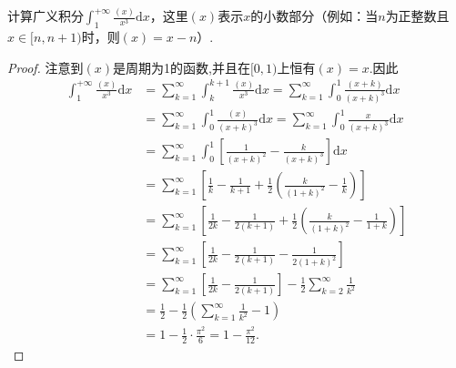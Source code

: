 \documentclass[../../main.tex]{subfiles}
\begin{document}
\begin{example}
计算广义积分$\int_{1}^{+\infty} \frac{(x)}{x^3} \mathrm{d}x$，这里$(x)$表示$x$的小数部分（例如：当$n$为正整数且$x \in [n, n+1)$时，则$(x) = x - n$）.
\end{example}
\begin{proof}
注意到$(x)$是周期为1的函数,并且在$[0,1)$上恒有$(x)=x$.因此
\begin{align*}
\int_1^{+\infty}{\frac{\left( x \right)}{x^3}\mathrm{d}x}&=\sum\limits_{k=1}^{\infty}{\int_k^{k+1}{\frac{\left( x \right)}{x^3}\mathrm{d}x}}=\sum\limits_{k=1}^{\infty}{\int_0^1{\frac{\left( x+k \right)}{\left( x+k \right) ^3}\mathrm{d}x}}
\\
&=\sum\limits_{k=1}^{\infty}{\int_0^1{\frac{\left( x \right)}{\left( x+k \right) ^3}\mathrm{d}x}}=\sum\limits_{k=1}^{\infty}{\int_0^1{\frac{x}{\left( x+k \right) ^3}\mathrm{d}x}}
\\
&=\sum\limits_{k=1}^{\infty}{\int_0^1{\left[ \frac{1}{\left( x+k \right) ^2}-\frac{k}{\left( x+k \right) ^3} \right] \mathrm{d}x}}
\\
&=\sum\limits_{k=1}^{\infty}{\left[ \frac{1}{k}-\frac{1}{k+1}+\frac{1}{2}\left( \frac{k}{\left( 1+k \right) ^2}-\frac{1}{k} \right) \right]}
\\
&=\sum\limits_{k=1}^{\infty}{\left[ \frac{1}{2k}-\frac{1}{2\left( k+1 \right)}+\frac{1}{2}\left( \frac{k}{\left( 1+k \right) ^2}-\frac{1}{1+k} \right) \right]}
\\
&=\sum\limits_{k=1}^{\infty}{\left[ \frac{1}{2k}-\frac{1}{2\left( k+1 \right)}-\frac{1}{2\left( 1+k \right) ^2} \right]}
\\
&=\sum\limits_{k=1}^{\infty}{\left[ \frac{1}{2k}-\frac{1}{2\left( k+1 \right)} \right]}-\frac{1}{2}\sum\limits_{k=2}^{\infty}{\frac{1}{k ^2}}
\\
&=\frac{1}{2}-\frac{1}{2}\left( \sum\limits_{k=1}^{\infty}{\frac{1}{k ^2}}-1 \right) 
\\
&=1-\frac{1}{2}\cdot \frac{\pi ^2}{6}=1-\frac{\pi ^2}{12}.
\end{align*}

\end{proof}
\end{document}
